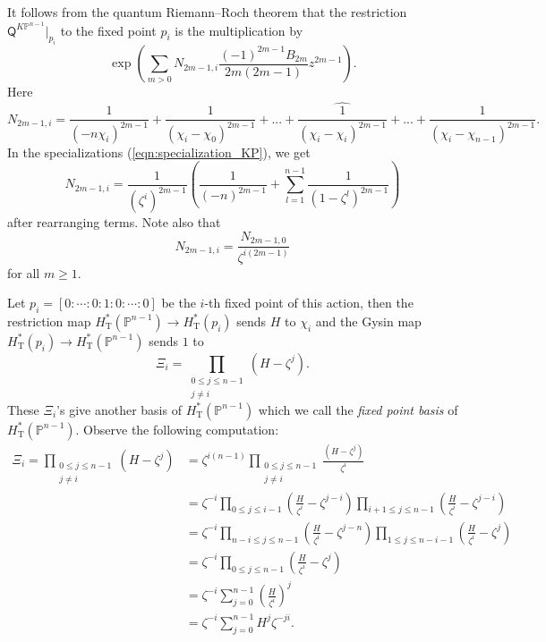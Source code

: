 \documentclass[12pt]{amsart}
\numberwithin{equation}{section}
\newcommand{\KP}{K\mathbb{P}}
\begin{document}
It follows from the quantum Riemann--Roch theorem \cite{cg} that the restriction $\mathsf{Q}^{\KP^{n-1}}|_{p_i}$ to the fixed point $p_i$ is the multiplication by 
\begin{equation}\label{eqn:qrr1}
\exp\left(\sum_{m>0}N_{2m-1, i}\frac{(-1)^{2m-1}B_{2m}}{2m(2m-1)}z^{2m-1}\right).    
\end{equation}
Here 
\begin{equation}
N_{2m-1,i}=\frac{1}{(-n\chi_i)^{2m-1}}+\frac{1}{(\chi_i-\chi_0)^{2m-1}}+...+\widehat{\frac{1}{(\chi_i-\chi_i)^{2m-1}}}+...+\frac{1}{(\chi_i-\chi_{n-1})^{2m-1}}.
\end{equation}
In the specializations (\ref{eqn:specialization_KP}), we get
\begin{equation}
N_{2m-1,i}=\frac{1}{(\zeta^i)^{2m-1}}\left(\frac{1}{(-n)^{2m-1}}+\sum_{l=1}^{n-1}\frac{1}{(1-\zeta^l)^{2m-1}}\right)
\end{equation}
after rearranging terms. Note also that 
\begin{equation}
N_{2m-1,i}=\frac{N_{2m-1,0}}{\zeta^{i(2m-1)}}
\end{equation}
for all $m\geq{1}$.



 Let $p_i=[0:\cdots:0:1:0:\cdots:0]$ be the $i$-th fixed point of this action, then the restriction map $H_{\mathrm{T}}^*\left(\mathbb{P}^{n-1}\right)\rightarrow{H_{\mathrm{T}}^*\left(p_i\right)}$ sends $H$ to $\chi_i$ and the Gysin map ${H_{\mathrm{T}}^*\left(p_i\right)}\rightarrow{H_{\mathrm{T}}^*\left(\mathbb{P}^{n-1}\right)}$ sends $1$ to
\begin{equation*}
\Xi_i=\prod_{\substack{0\leq{j}\leq{n-1}\\j\neq{i}}}(H-\zeta^j).
\end{equation*}
These $\Xi_i$'s give another basis of $H_{\mathrm{T}}^*\left(\mathbb{P}^{n-1}\right)$ which we call the \textit{fixed point basis} of $H_{\mathrm{T}}^*\left(\mathbb{P}^{n-1}\right)$. Observe the following computation:
\begin{equation}\label{eqn:fixedpt_bss_as_a_sum}
\begin{split}
\Xi_i=\prod_{\substack{0\leq{j}\leq{n-1}\\j\neq{i}}}(H-\zeta^j)
&=\zeta^{i(n-1)}\prod_{\substack{0\leq{j}\leq{n-1}\\j\neq{i}}}\frac{(H-\zeta^j)}{\zeta^{i}}\\
&=\zeta^{-i}\prod_{0\leq{j}\leq{i-1}}\left(\frac{H}{\zeta^{i}}-\zeta^{j-i}\right)\prod_{i+1\leq{j}\leq{n-1}}\left(\frac{H}{\zeta^{i}}-\zeta^{j-i}\right)\\
&=\zeta^{-i}\prod_{n-i\leq{j}\leq{n-1}}\left(\frac{H}{\zeta^{i}}-\zeta^{j-n}\right)\prod_{1\leq{j}\leq{n-i-1}}\left(\frac{H}{\zeta^{i}}-\zeta^{j}\right)\\
&=\zeta^{-i}\prod_{0\leq{j}\leq{n-1}}\left(\frac{H}{\zeta^i}-\zeta^j\right)\\
&=\zeta^{-i}\sum_{j=0}^{n-1}\left(\frac{H}{\zeta^i}\right)^{j}\\
&=\zeta^{-i}\sum_{j=0}^{n-1}H^j\zeta^{-ji}.
\end{split}
\end{equation}
\end{document}
